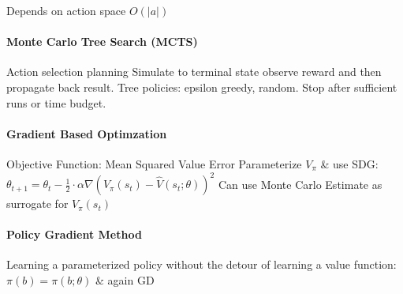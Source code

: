 \documentclass[a4paper, 11pt]{scrartcl}
\begin{document}
\begin{multicols*}{3}
Depends on action space $O(|a|)$

\paragraph{Monte Carlo Tree Search (MCTS)}
Action selection planning
Simulate to terminal state observe reward and then propagate back result. Tree policies: epsilon greedy, random. Stop after sufficient runs or time budget.

\paragraph{Gradient Based Optimzation}
Objective Function: Mean Squared Value Error
Parameterize $V_\pi$ \& use SDG:
$\theta_{t+1} = \theta_{t} - \frac{1}{2}\cdot\alpha\nabla(V_\pi(s_t) - \hat{V}(s_t; \theta ))^2$
Can use Monte Carlo Estimate as surrogate for $V_\pi(s_t)$

\paragraph{Policy Gradient Method}
Learning a parameterized policy without the detour of learning a value function: $\pi(b) = \pi(b;\theta)$ \& again GD

\end{multicols*}
\end{document}
